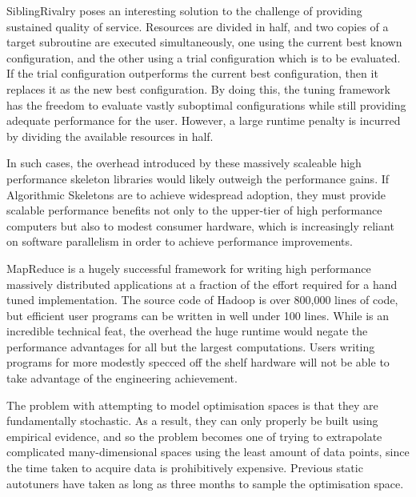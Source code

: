 SiblingRivalry poses an interesting solution to the challenge of
providing sustained quality of service. Resources are divided in half,
and two copies of a target subroutine are executed simultaneously, one
using the current best known configuration, and the other using a
trial configuration which is to be evaluated. If the trial
configuration outperforms the current best configuration, then it
replaces it as the new best configuration. By doing this, the tuning
framework has the freedom to evaluate vastly suboptimal configurations
while still providing adequate performance for the user. However, a
large runtime penalty is incurred by dividing the available resources
in half.

In such cases, the overhead introduced by these massively scaleable
high performance skeleton libraries would likely outweigh the
performance gains. If Algorithmic Skeletons are to achieve widespread
adoption, they must provide scalable performance benefits not only to
the upper-tier of high performance computers but also to modest
consumer hardware, which is increasingly reliant on software
parallelism in order to achieve performance improvements.

MapReduce is a hugely successful framework for writing high
performance massively distributed applications at a fraction of the
effort required for a hand tuned implementation. The source code of
Hadoop is over 800,000 lines of code, but efficient user programs can
be written in well under 100 lines. While is an incredible technical
feat, the overhead the huge runtime would negate the performance
advantages for all but the largest computations. Users writing
programs for more modestly specced off the shelf hardware will not be
able to take advantage of the engineering achievement.

The problem with attempting to model optimisation spaces is that they
are fundamentally stochastic. As a result, they can only properly be
built using empirical evidence, and so the problem becomes one of
trying to extrapolate complicated many-dimensional spaces using the
least amount of data points, since the time taken to acquire data is
prohibitively expensive. Previous static autotuners have taken as long
as three months to sample the optimisation space.

